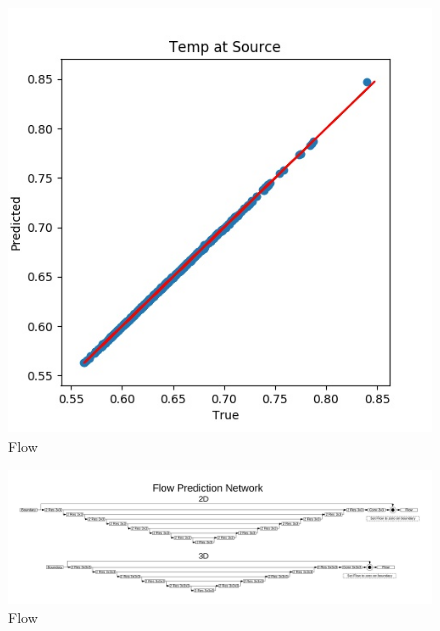 \documentclass{article} %
\begin{document}
\begin{figure}[h]
\begin{center}
\includegraphics[scale=0.15]{../test/figs/heat_accuracy.jpeg}
\end{center}
\caption{Flow}
\end{figure}


\begin{figure}[h]
\begin{center}
\includegraphics[scale=0.45]{./appendix_flow_net.pdf}
\end{center}
\caption{Flow}
\end{figure}
\end{document}
